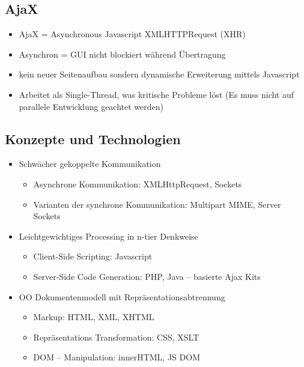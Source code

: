 \documentclass{article} %
\begin{document}
	\subsection{AjaX}
	\begin{itemize}
		\item AjaX = Asynchronous Javascript XMLHTTPRequest (XHR)
		\item Asynchron = GUI nicht blockiert während Übertragung
		\item kein neuer Seitenaufbau sondern dynamische Erweiterung mittels Javascript
		\item Arbeitet als Single-Thread, was kritische Probleme löst (Es muss nicht auf parallele Entwicklung geachtet werden)
	\end{itemize}
	\subsection{Konzepte und Technologien}
	\begin{itemize}
		\item Schwächer gekoppelte Kommunikation
		\begin{itemize}
			\item Asynchrone Kommunikation: XMLHttpRequest, Sockets
			\item Varianten der synchrone Kommunikation: Multipart MIME, Server Sockets
		\end{itemize}
		\item Leichtgewichtiges Processing in n-tier Denkweise
		\begin{itemize}
			\item Client-Side Scripting: Javascript
			\item Server-Side Code Generation: PHP, Java – basierte Ajax Kits
		\end{itemize}
		\item OO Dokumentenmodell mit Repräsentationsabtrennung
		\begin{itemize}
			\item Markup: HTML, XML, XHTML
			\item Repräsentations Transformation: CSS, XSLT
			\item DOM – Manipulation: innerHTML, JS DOM
		\end{itemize}
	\end{itemize}
\end{document}
